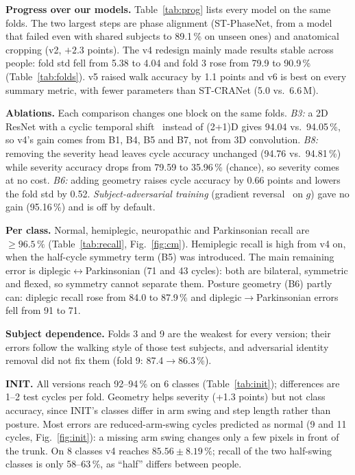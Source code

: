 \documentclass[conference]{IEEEtran}
\begin{document}
\textbf{Progress over our models.} Table~\ref{tab:prog} lists every model on
the same folds. The two largest steps are phase alignment (ST-PhaseNet, from a
model that failed even with shared subjects to 89.1\,\% on unseen ones) and
anatomical cropping (v2, $+2.3$ points). The v4 redesign mainly made results
stable across people: fold std fell from 5.38 to 4.04 and fold 3 rose from 79.9
to 90.9\,\% (Table~\ref{tab:folds}). v5 raised walk accuracy by 1.1 points and
v6 is best on every summary metric, with fewer parameters than ST-CRANet
(5.0 vs.\ 6.6\,M).

\textbf{Ablations.} Each comparison changes one block on the same folds.
\emph{B3:} a 2D ResNet with a cyclic temporal shift~\cite{lin2019tsm} instead of
(2+1)D gives 94.04 vs.\ 94.05\,\%, so v4's gain comes from B1, B4, B5 and B7,
not from 3D convolution. \emph{B8:} removing the severity head leaves cycle
accuracy unchanged (94.76 vs.\ 94.81\,\%) while severity accuracy drops from
79.59 to 35.96\,\% (chance), so severity comes at no cost. \emph{B6:} adding
geometry raises cycle accuracy by 0.66 points and lowers the fold std by 0.52.
\emph{Subject-adversarial training} (gradient reversal~\cite{ganin2015} on $g$)
gave no gain (95.16\,\%) and is off by default.

\textbf{Per class.} Normal, hemiplegic, neuropathic and Parkinsonian recall are
$\ge96.5\,\%$ (Table~\ref{tab:recall}, Fig.~\ref{fig:cm}). Hemiplegic recall is
high from v4 on, when the half-cycle symmetry term (B5) was introduced. The main
remaining error is diplegic$\leftrightarrow$Parkinsonian (71 and 43 cycles):
both are bilateral, symmetric and flexed, so symmetry cannot separate them.
Posture geometry (B6) partly can: diplegic recall rose from 84.0 to 87.9\,\%
and diplegic$\rightarrow$Parkinsonian errors fell from 91 to 71.

\textbf{Subject dependence.} Folds 3 and 9 are the weakest for every version;
their errors follow the walking style of those test subjects, and adversarial
identity removal did not fix them (fold 9: 87.4$\rightarrow$86.3\,\%).

\textbf{INIT.} All versions reach 92--94\,\% on 6 classes
(Table~\ref{tab:init}); differences are 1--2 test cycles per fold. Geometry
helps severity (+1.3 points) but not class accuracy, since INIT's classes
differ in arm swing and step length rather than posture. Most errors are
reduced-arm-swing cycles predicted as normal (9 and 11 cycles,
Fig.~\ref{fig:init}): a missing arm swing changes only a few pixels in front of
the trunk. On 8 classes v4 reaches $85.56\pm8.19\,\%$; recall of the two
half-swing classes is only 58--63\,\%, as ``half'' differs between people.
\end{document}
